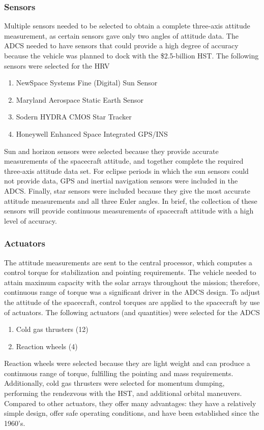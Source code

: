 \documentclass[paper=letter, fontsize=11pt]{scrartcl} %
\numberwithin{equation}{section} %
\numberwithin{figure}{section} %
\numberwithin{table}{section} %
\begin{document}
\subsubsection{Sensors}
\noindent Multiple sensors needed to be selected to obtain a complete three-axis attitude measurement, as certain sensors gave only two angles of attitude data. The ADCS needed to have sensors that could provide a high degree of accuracy because the vehicle was planned to dock with the \$2.5-billion HST. The following sensors were selected for the HRV
\begin{enumerate}
\item NewSpace Systems Fine (Digital) Sun Sensor
\item Maryland Aerospace Static Earth Sensor
\item Sodern HYDRA CMOS Star Tracker
\item Honeywell Enhanced Space Integrated GPS/INS
\end{enumerate}
\bigskip
\par Sun and horizon sensors were selected because they provide accurate measurements of the spacecraft attitude, and together complete the required three-axis attitude data set. For eclipse periods in which the sun sensors could not provide data, GPS and inertial navigation sensors were included in the ADCS. Finally, star sensors were included because they give the most accurate attitude measurements and all three Euler angles. In brief, the collection of these sensors will provide continuous measurements of spacecraft attitude with a high level of accuracy.
\subsubsection{Actuators}
The attitude measurements are sent to the central processor, which computes a control torque for stabilization and pointing requirements. The vehicle needed to attain maximum capacity with the solar arrays throughout the mission; therefore, continuous range of torque was a significant driver in the ADCS design. To adjust the attitude of the spacecraft, control torques are applied to the spacecraft by use of actuators. The following actuators (and quantities) were selected for the ADCS
\begin{enumerate}
\item Cold gas thrusters (12)
\item Reaction wheels (4)
\end{enumerate}

\par Reaction wheels were selected because they are light weight and can produce a continuous range of torque, fulfilling the pointing and mass requirements. Additionally, cold gas thrusters were selected for momentum dumping, performing the rendezvous with the HST, and additional orbital maneuvers. Compared to other actuators, they offer many advantages: they have a relatively simple design, offer safe operating conditions, and have been established since the 1960's.
\end{document}
